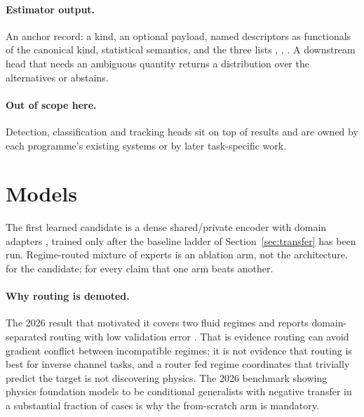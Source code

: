 \documentclass[11pt,a4paper]{article}
\begin{document}
\paragraph{Estimator output.} An anchor record: a kind, an optional payload, named descriptors as functionals of the canonical kind, statistical semantics, and the three lists , , . A downstream head that needs an ambiguous quantity returns a distribution over the alternatives or abstains.

\paragraph{Out of scope here.} Detection, classification and tracking heads sit on top of results and are owned by each programme's existing systems or by later task-specific work.

\section{Models}

The first learned candidate is a dense shared/private encoder with domain adapters \citep{bousmalis2016}, trained only after the baseline ladder of Section~\ref{sec:transfer} has been run. Regime-routed mixture of experts is an ablation arm, not the architecture. \tagP{} for the candidate; \tagH{} for every claim that one arm beats another.

\paragraph{Why routing is demoted.} The 2026 result that motivated it covers two fluid regimes and reports domain-separated routing with low validation error \citep{sharma2026}. That is evidence routing can avoid gradient conflict between incompatible regimes; it is not evidence that routing is best for inverse channel tasks, and a router fed regime coordinates that trivially predict the target is not discovering physics. The 2026 benchmark showing physics foundation models to be conditional generalists with negative transfer in a substantial fraction of cases \citep{chu2026} is why the from-scratch arm is mandatory.
\end{document}
